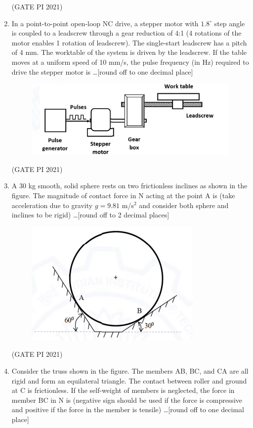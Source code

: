 \documentclass[journal,12pt,onecolumn]{IEEEtran}
\theoremstyle{remark}
\begin{document}
\begin{enumerate}
\hfill (GATE PI 2021)

\item
In a point-to-point open-loop NC drive, a stepper motor with $1.8^\circ$ step angle is coupled to a leadscrew through a gear reduction of 4:1 (4 rotations of the motor enables 1 rotation of leadscrew). The single-start leadscrew has a pitch of 4 mm. The worktable of the system is driven by the leadscrew. If the table moves at a uniform speed of 10 mm/s, the pulse frequency (in Hz) required to drive the stepper motor is \dots [round off to one decimal place]

\begin{figure}[H]
    \centering
    \includegraphics[width=0.5\columnwidth]{figs/fig7.png}
    \caption{}
    \label{fig:placeholder}
\end{figure} 

\hfill (GATE PI 2021)

\item
A 30 kg smooth, solid sphere rests on two frictionless inclines as shown in the figure. The magnitude of contact force in N acting at the point A is (take acceleration due to gravity $g = 9.81$ m/s$^2$ and consider both sphere and inclines to be rigid) \dots [round off to 2 decimal places]

\begin{figure}[H]
    \centering
    \includegraphics[width=0.5\columnwidth]{figs/fig8.png}
    \caption{}
    \label{fig:placeholder}
\end{figure} 

\hfill (GATE PI 2021)

\item
Consider the truss shown in the figure. The members AB, BC, and CA are all rigid and form an equilateral triangle. The contact between roller and ground at C is frictionless. If the self-weight of members is neglected, the force in member BC in N is (negative sign should be used if the force is compressive and positive if the force in the member is tensile) \dots [round off to one decimal place]


\end{enumerate}
\end{document}
